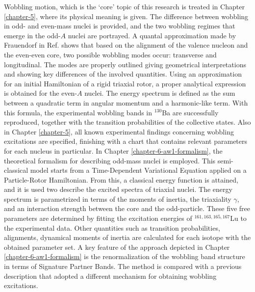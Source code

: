 Wobbling motion, which is the `core' topic of this research is treated in Chapter \ref{chapter-5}, where its physical meaning is given. The difference between wobbling in odd- and even-mass nuclei is provided, and the two wobbling regimes that emerge in the odd-$A$ nuclei are portrayed. A quantal approximation made by Frauendorf in Ref. \cite{frauendorf2014transverse} shows that based on the alignment of the valence nucleon and the even-even core, two possible wobbling modes occur: transverse and longitudinal. The modes are properly outlined giving geometrical interpretations and showing key differences of the involved quantities. Using an approximation for an initial Hamiltonian of a rigid triaxial rotor, a proper analytical expression is obtained for the even-$A$ nuclei. The energy spectrum is defined as the sum between a quadratic term in angular momentum and a harmonic-like term. With this formula, the experimental wobbling bands in $^{130}$Ba are successfully reproduced, together with the transition probabilities of the collective states. Also in Chapter \ref{chapter-5}, all known experimental findings concerning wobbling excitations are specified, finishing with a chart that contains relevant parameters for each nucleus in particular. In Chapter \ref{chapter-6-aw1-formalism}, the theoretical formalism for describing odd-mass nuclei is employed. This semi-classical model starts from a Time-Dependent Variational Equation applied on a Particle-Rotor Hamiltonian. From this, a classical energy function is attained, and it is used two describe the excited spectra of triaxial nuclei. The energy spectrum is parametrized in terms of the moments of inertia, the triaxiality $\gamma$, and an interaction strength between the core and the odd-particle. These five free parameters are determined by fitting the excitation energies of $^{161,163,165,167}$Lu to the experimental data. Other quantities such as transition probabilities, alignments, dynamical moments of inertia are calculated for each isotope with the obtained parameter set. A key feature of the approach depicted in Chapter \ref{chapter-6-aw1-formalism} is the renormalization of the wobbling band structure in terms of Signature Partner Bands. The method is compared with a previous description that adopted a different mechanism for obtaining wobbling excitations.

